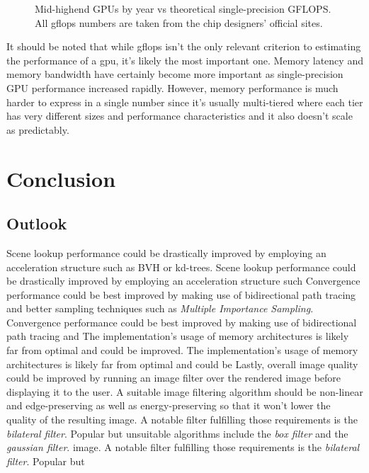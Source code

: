 \documentclass[
  twoside,
  11pt, a4paper,
  footinclude=true,
  headinclude=true,
  cleardoublepage=empty
]{scrreprt}
\begin{document}
\begin{figure}[H]
    \centering
    \caption{Mid-highend GPUs by year vs theoretical single-precision GFLOPS.
    All \ac{gflops} numbers are taken from the chip designers' official sites.}
    \label{fig:gpus-by-year}
\end{figure}

It should be noted that while \ac{gflops} isn't the only relevant criterion to estimating the
performance of a \ac{gpu}, it's likely the most important one. Memory latency and memory bandwidth
have certainly become more important as single-precision GPU performance increased rapidly.
However, memory performance is much harder to express in a single number since it's usually
multi-tiered where each tier has very different sizes and performance characteristics and it also
doesn't scale as predictably.
\chapter{Conclusion}

\section{Outlook}

Scene lookup performance could be drastically improved by employing an acceleration structure such
as BVH or kd-trees.
Scene lookup performance could be drastically improved by employing an acceleration structure such
Convergence performance could be best improved by making use of bidirectional path tracing and
better sampling techniques such as \textit{Multiple Importance Sampling}.
Convergence performance could be best improved by making use of bidirectional path tracing and
The implementation's usage of memory architectures is likely far from optimal and could be
improved.
The implementation's usage of memory architectures is likely far from optimal and could be
Lastly, overall image quality could be improved by running an image filter over the rendered image
before displaying it to the user. A suitable image filtering algorithm should be non-linear and
edge-preserving as well as energy-preserving so that it won't lower the quality of the resulting
image. A notable filter fulfilling those requirements is the \textit{bilateral filter}. Popular but
unsuitable algorithms include the \textit{box filter} and the \textit{gaussian filter}.
image. A notable filter fulfilling those requirements is the \textit{bilateral filter}. Popular but
\listoffigures
\listoflistings
\listoftables


\end{document}
